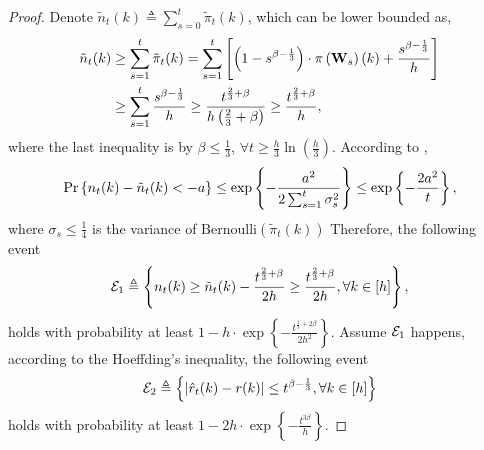 \begin{proof}
    Denote $\tilde{n}_t(k) \triangleq \sum\limits_{s=0}^{t}{ \tilde{\pi}_t(k)}$, which can be lower bounded as,
\begin{equation*}
\begin{split}
    \tilde{n}_t(k) &\ge \sum\limits_{s=1}^{t}{ \tilde{\pi}_t(k)} = \sum\limits_{s=1}^{t}{ \left[ \left( 1 - s^{\beta - \frac{1}{3}} \right) \cdot \pi\left({\mathbf{W}}_{s}\right)(k) + \frac{s^{\beta - \frac{1}{3}}}{h} \right] } \\
    &\ge \sum\limits_{s=1}^{t}{ \frac{s^{\beta - \frac{1}{3}}}{h} } \ge \frac{t^{\frac{2}{3} + \beta}}{ h  \left(\frac{2}{3} + \beta \right) } \ge \frac{t^{\frac{2}{3} + \beta}}{ h },
\end{split}
\end{equation*}
where the last inequality is by $\beta \le \frac{1}{3}$, $\forall t \ge \frac{h}{3} \ln{\left(\frac{h}{3}\right) }$. According to \citep{wainwright2019high},
\begin{equation*}
\begin{split}
    {\text{Pr}}\left\{ n_t(k) - \tilde{n}_t(k) < - a \right\} \le \exp\left\{ - \frac{a^2}{2 \sum_{s=1}^{t}{\sigma_s^2} } \right\} \le \exp\left\{ - \frac{2 a^2}{ t } \right\},
\end{split}
\end{equation*}
where $\sigma_s \le \frac{1}{4}$ is the variance of $\text{Bernoulli}\left( \tilde{\pi}_t(k) \right)$
Therefore, the following event
\begin{equation*}
    {\mathcal{E}}_1 \triangleq \left\{ n_t(k) \ge \tilde{n}_t(k) - \frac{t^{\frac{2}{3} + \beta}}{ 2 h } \ge \frac{t^{\frac{2}{3} + \beta}}{ 2 h }, \forall k \in [h] \right\},
\end{equation*}
holds with probability at least $1 - h \cdot \exp\left\{ -  \frac{t^{\frac{1}{3} + 2 \beta}}{2 h^2} \right\}$. Assume ${\mathcal{E}}_1$ happens, according to the Hoeffding's inequality, the following event
\begin{equation*}
    {\mathcal{E}}_2 \triangleq \left\{ \left| \hat{r}_{t}(k) - r(k) \right| \le t^{\beta - \frac{1}{3}} , \forall k \in [h] \right\}
\end{equation*}
holds with probability at least $1 - 2 h \cdot \exp\left\{ - \frac{t^{3\beta}}{ h } \right\}$.
\end{proof}

